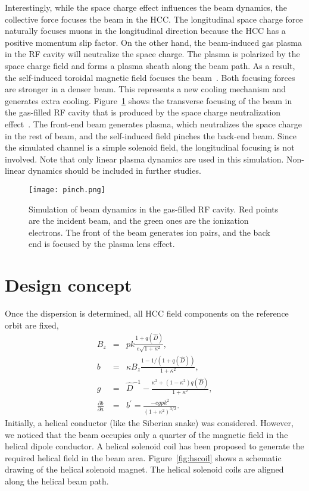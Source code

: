 \documentclass[11pt]{article}
\begin{document}
Interestingly, while the space charge effect influences the beam dynamics, the collective force focuses the beam in the HCC. The longitudinal space charge force naturally focuses muons in the longitudinal direction because the HCC has a positive momentum slip factor. On the other hand, the beam-induced gas plasma in the RF cavity will neutralize the space charge. The plasma is polarized by the space charge field and forms a plasma sheath along the beam path. 
As a result, the self-induced toroidal magnetic field focuses the beam~\cite{Kwang14}. 
Both focusing forces are stronger in a denser beam. 
This represents a new cooling mechanism and generates extra cooling. 
Figure~\ref{fig:lens} shows the transverse focusing of the beam in the gas-filled RF cavity that is produced by the space charge neutralization effect~\cite{Ellison}. 
The front-end beam generates plasma, which neutralizes the space charge in the rest of beam, and the self-induced field pinches the back-end beam. 
Since the simulated channel is a simple solenoid field, the longitudinal focusing is not involved. 
Note that only linear plasma dynamics are used in this simulation. 
Non-linear dynamics should be included in further studies. 
\begin{figure}[h]
\centering
 \texttt{[image: pinch.png]}
 \caption{Simulation of beam dynamics in the gas-filled RF cavity. 
 Red points are the incident beam, and the green ones are the ionization electrons.
 The front of the beam generates ion pairs, and the back end is focused by the plasma lens effect. 
   }
  \label{fig:lens}
\end{figure}

\section{Design concept}
Once the dispersion is determined, all HCC field components on the reference orbit are fixed,
\begin{eqnarray}
    B_{z} &=& pk \frac{1+q(\hat{D})}{e \sqrt{1+\kappa^2}}, \label{eq:bz} \\
    b &=& \kappa B_z \frac{1-1/(1+q(\hat{D}))}{1+\kappa^2}, \label{eq:b} \\
    g &=& \hat{D}^{-1}-\frac{\kappa^2+(1-\kappa^2)q(\hat{D})}{1+\kappa^2}, \label{eq:g} \\
    \frac{\partial b}{\partial a} &=& b^\prime = \frac{-e g p k^2}{(1+\kappa^2)^{3/2}}. \label{eq:bp}
\end{eqnarray}
Initially, a helical conductor (like the Siberian snake) was considered. 
However, we noticed that the beam occupies only a quarter of the magnetic field in the helical dipole conductor. 
A helical solenoid coil has been proposed to generate the required helical field in the beam area. 
Figure~\ref{fig:hscoil} shows a schematic drawing of the helical solenoid magnet. 
The helical solenoid coils are aligned along the helical beam path. 
\end{document}
